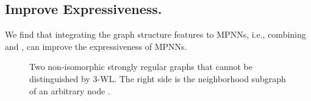 \documentclass{article}
\theoremstyle{plain}
\begin{document}
\subsection{Improve Expressiveness.}
We find that integrating the graph structure features to MPNNs, i.e., combining  and , can improve the expressiveness of MPNNs. 


\begin{figure}[t]
\centering
{}
\caption{Two non-isomorphic strongly regular graphs that cannot be distinguished by 3-WL. The right side is the neighborhood subgraph of an arbitrary node .}
\label{fig:srg}
\end{figure}
\end{document}
